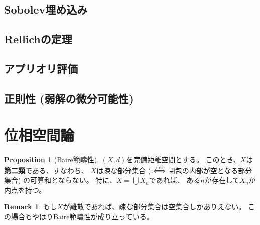 \documentclass[uplatex]{jsarticle}
\theoremstyle{definition}
\newtheorem{prop}[prop]{Proposition}
\newtheorem{rem}[rem]{Remark}
\newcommand{\deff}{:\hspace{-3pt}\overset{\text{def}}{\iff}}
\begin{document}
\subsection{Sobolev埋め込み}


\subsection{Rellichの定理}


\subsection{アプリオリ評価}

\subsection{正則性 (弱解の微分可能性)}



















\appendix


\section{位相空間論}



\begin{prop}[Baire範疇性]
  \label{Baire category}
  \((X,d)\)を完備距離空間とする。
  このとき、\(X\)は\textbf{第二類}である、すなわち、
  \(X\)は疎な部分集合 (\(\deff\)閉包の内部が空となる部分集合)
  の可算和とならない。
  特に、\(X = \bigcup X_n\)であれば、
  ある\(n\)が存在して\(\overline{X}_n\)が内点を持つ。
\end{prop}

\begin{rem}
  もし\(X\)が離散であれば、疎な部分集合は空集合しかありえない。
  この場合もやはりBaire範疇性が成り立っている。
\end{rem}
\end{document}
